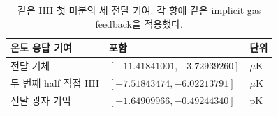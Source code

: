 \begin{table}[H]\centering\footnotesize
\caption{같은 HH 첫 미분의 세 전달 기여. 각 항에 같은 implicit gas feedback을 적용했다.}
\label{tab:memory}
\setlength{\tabcolsep}{4pt}
\begin{tabular}{@{}lll@{}}\toprule
온도 응답 기여 & 포함 & 단위\\\midrule
전달 기체 & $[-11.41841001, -3.72939260]$ & $\mu\mathrm K$\\
두 번째 half 직접 HH & $[-7.51843474, -6.02213791]$ & $\mu\mathrm K$\\
전달 광자 기억 & $[-1.64909966, -0.49244340]$ & $\mathrm{pK}$\\
\bottomrule\end{tabular}
\end{table}
